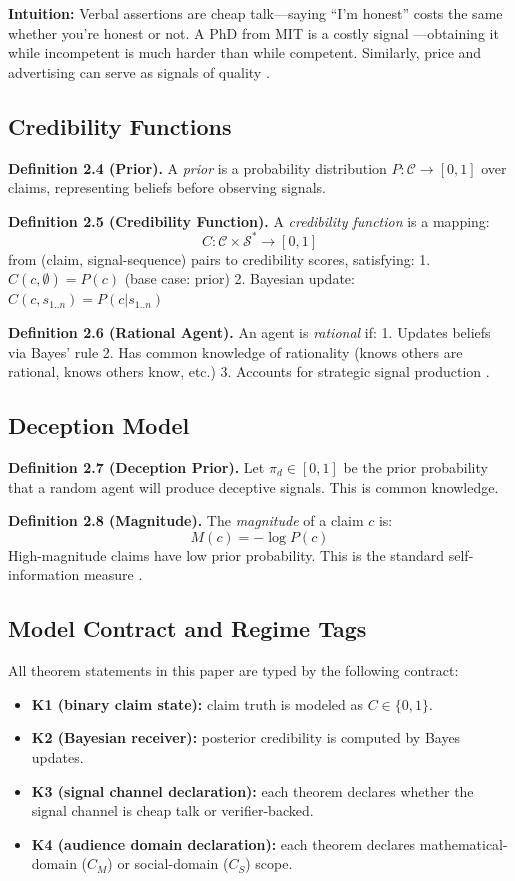 \textbf{Intuition:} Verbal assertions are cheap talk---saying ``I'm
honest'' costs the same whether you're honest or not. A PhD from MIT is
a costly signal \cite{spence1973job}---obtaining it while incompetent is much harder than
while competent. Similarly, price and advertising can serve as signals of quality \cite{milgrom1986price}.

\subsection{Credibility Functions}\label{credibility-functions}

\textbf{Definition 2.4 (Prior).} A \emph{prior} is a probability
distribution \(P : \mathcal{C} \to [0,1]\) over claims, representing
beliefs before observing signals.

\textbf{Definition 2.5 (Credibility Function).} A \emph{credibility
function} is a mapping:
\[C : \mathcal{C} \times \mathcal{S}^* \to [0,1]\] from (claim,
signal-sequence) pairs to credibility scores, satisfying: 1.
\(C(c, \emptyset) = P(c)\) (base case: prior) 2. Bayesian update:
\(C(c, s_{1..n}) = P(c | s_{1..n})\)

\textbf{Definition 2.6 (Rational Agent).} An agent is \emph{rational}
if: 1. Updates beliefs via Bayes' rule 2. Has common knowledge of
rationality \cite{aumann1995backward} (knows others are rational, knows others know, etc.) 3.
Accounts for strategic signal production \cite{cho1987signaling}.

\subsection{Deception Model}\label{deception-model}

\textbf{Definition 2.7 (Deception Prior).} Let \(\pi_d \in [0,1]\) be
the prior probability that a random agent will produce deceptive
signals. This is common knowledge.

\textbf{Definition 2.8 (Magnitude).} The \emph{magnitude} of a claim
\(c\) is: \[M(c) = -\log P(c)\] High-magnitude claims have low prior
probability. This is the standard self-information measure \cite{shannon1948}.

\subsection{Model Contract and Regime Tags}\label{sec:credibility-contract}

All theorem statements in this paper are typed by the following contract:
\begin{itemize}
\item \textbf{K1 (binary claim state):} claim truth is modeled as \(C \in \{0,1\}\).
\item \textbf{K2 (Bayesian receiver):} posterior credibility is computed by Bayes updates.
\item \textbf{K3 (signal channel declaration):} each theorem declares whether the signal channel is cheap talk or verifier-backed.
\item \textbf{K4 (audience domain declaration):} each theorem declares mathematical-domain (\(C_M\)) or social-domain (\(C_S\)) scope.
\end{itemize}

